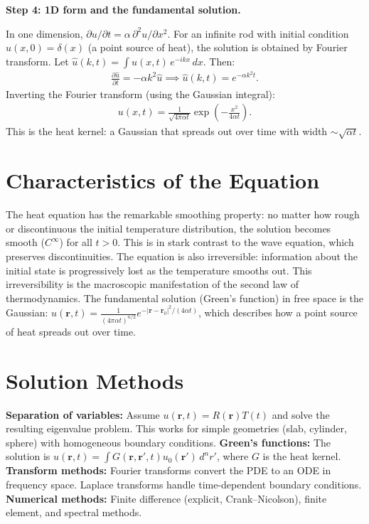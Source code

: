 \textbf{Step 4: 1D form and the fundamental solution.}

In one dimension, $\partial u/\partial t = \alpha\,\partial^2 u/\partial x^2$. For an infinite rod with initial condition $u(x, 0) = \delta(x)$ (a point source of heat), the solution is obtained by Fourier transform. Let $\hat{u}(k, t) = \int u(x, t)\,e^{-ikx}\,dx$. Then:
\begin{align}
\frac{\partial\hat{u}}{\partial t} = -\alpha k^2\hat{u} \implies \hat{u}(k, t) = e^{-\alpha k^2 t}.
\end{align}
Inverting the Fourier transform (using the Gaussian integral):
\begin{align}
u(x, t) = \frac{1}{\sqrt{4\pi\alpha t}}\exp\!\left(-\frac{x^2}{4\alpha t}\right).
\end{align}
This is the heat kernel: a Gaussian that spreads out over time with width $\sim\sqrt{\alpha t}$.

\section*{Characteristics of the Equation}

The heat equation has the remarkable smoothing property: no matter how rough or discontinuous the initial temperature distribution, the solution becomes smooth ($C^\infty$) for all $t > 0$. This is in stark contrast to the wave equation, which preserves discontinuities. The equation is also irreversible: information about the initial state is progressively lost as the temperature smooths out. This irreversibility is the macroscopic manifestation of the second law of thermodynamics. The fundamental solution (Green's function) in free space is the Gaussian: $u(\mathbf{r}, t) = \frac{1}{(4\pi\alpha t)^{n/2}}e^{-|\mathbf{r}-\mathbf{r}_0|^2/(4\alpha t)}$, which describes how a point source of heat spreads out over time.
\section*{Solution Methods}

\textbf{Separation of variables:} Assume $u(\mathbf{r}, t) = R(\mathbf{r})T(t)$ and solve the resulting eigenvalue problem. This works for simple geometries (slab, cylinder, sphere) with homogeneous boundary conditions. \textbf{Green's functions:} The solution is $u(\mathbf{r}, t) = \int G(\mathbf{r}, \mathbf{r}', t) u_0(\mathbf{r}')\,d^n r'$, where $G$ is the heat kernel. \textbf{Transform methods:} Fourier transforms convert the PDE to an ODE in frequency space. Laplace transforms handle time-dependent boundary conditions. \textbf{Numerical methods:} Finite difference (explicit, Crank--Nicolson), finite element, and spectral methods.
